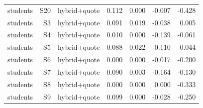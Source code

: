 \begin{table}[t]
{\begin{tabular}{@{}lrrrrrr@{}}
students & S20 & hybrid+quote & 0.112 & 0.000 & -0.007 & -0.428 \\
students & S3 & hybrid+quote & 0.091 & 0.019 & -0.038 & 0.005 \\
students & S4 & hybrid+quote & 0.010 & 0.000 & -0.139 & -0.061 \\
students & S5 & hybrid+quote & 0.088 & 0.022 & -0.110 & -0.044 \\
students & S6 & hybrid+quote & 0.000 & 0.000 & -0.017 & -0.200 \\
students & S7 & hybrid+quote & 0.090 & 0.003 & -0.164 & -0.130 \\
students & S8 & hybrid+quote & 0.000 & 0.000 & 0.000 & -0.333 \\
students & S9 & hybrid+quote & 0.099 & 0.000 & -0.028 & -0.250 \\
\bottomrule
\end{tabular}
}
\end{table}
